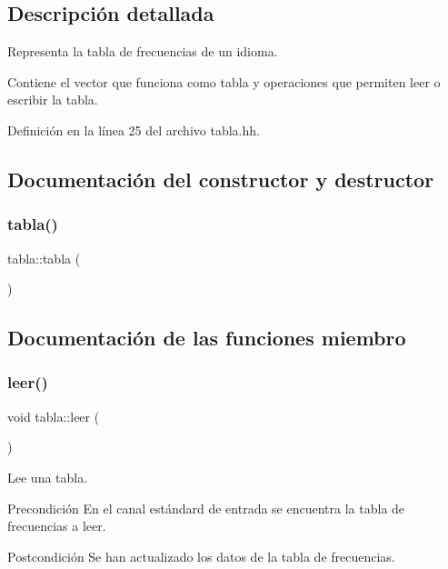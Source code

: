 \subsection{Descripción detallada}
Representa la tabla de frecuencias de un idioma. 

Contiene el vector que funciona como tabla y operaciones que permiten leer o escribir la tabla. 

Definición en la línea 25 del archivo tabla.\+hh.



\subsection{Documentación del constructor y destructor}
\mbox{\label{classtabla_a47ec7f5106829c96469acb80c4992849}} 
\subsubsection{\texorpdfstring{tabla()}{tabla()}}
{\footnotesize\ttfamily tabla\+::tabla (\begin{DoxyParamCaption}{ }\end{DoxyParamCaption})}



\subsection{Documentación de las funciones miembro}
\mbox{\label{classtabla_ab297ddbd500d85a98d7c801697b73721}} 
\subsubsection{\texorpdfstring{leer()}{leer()}}
{\footnotesize\ttfamily void tabla\+::leer (\begin{DoxyParamCaption}{ }\end{DoxyParamCaption})}



Lee una tabla. 

\begin{DoxyPrecond}{Precondición}
En el canal estándard de entrada se encuentra la tabla de frecuencias a leer. 
\end{DoxyPrecond}
\begin{DoxyPostcond}{Postcondición}
Se han actualizado los datos de la tabla de frecuencias. 
\end{DoxyPostcond}
\mbox{\label{classtabla_a37f915651b80eaa0c6dc47c23ff92557}} 
